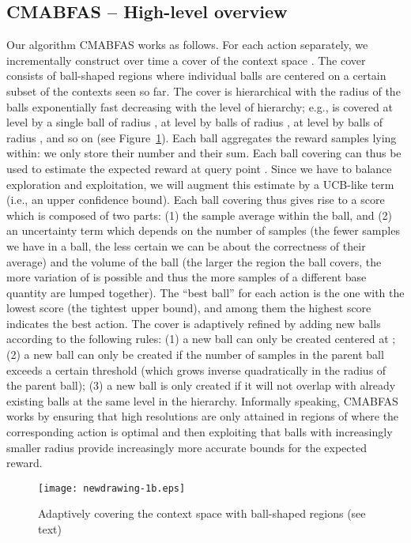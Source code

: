 \documentclass{llncs}
\begin{document}
\subsection{CMABFAS -- High-level overview} 
Our algorithm CMABFAS works as follows. For each action  separately, we incrementally
construct over time  a cover of the context space . The cover 
consists of ball-shaped regions where individual balls are centered on a certain subset
of the contexts  seen so far. The cover is hierarchical with the radius
of the balls exponentially fast decreasing with the level of hierarchy; e.g.,  is covered 
at level  by a single ball of radius , at level  by balls of radius , at 
level  by balls of radius , and so on (see Figure~\ref{fig:12}). Each ball aggregates the reward samples
lying within: we only store their number and their sum. Each ball covering  can thus
be used to estimate the expected reward  at query point . Since we have to 
balance exploration and exploitation, we will augment this estimate by a UCB-like term (i.e., 
an upper confidence bound). Each ball
covering  thus gives rise to a score which is composed of two parts: (1) the sample 
average within the ball, and (2) an uncertainty term which depends on the number
of samples (the fewer samples we have in a ball, the less certain we can be
about the correctness of their average) and the volume of the ball (the larger 
the region the ball covers, the more variation of  is possible and thus the 
more samples of a different base quantity are lumped together). The ``best ball'' 
for each action is the one with the lowest score (the tightest upper bound), and 
among them the highest score indicates the best action.  
The cover is adaptively refined by adding new balls according to the following rules: 
(1) a new ball can only be created centered at ; (2) a new ball can 
only be created if the number of samples in the parent ball exceeds a certain
threshold (which grows inverse quadratically in the radius of the parent ball);
(3) a new ball is only created if it will not overlap with already existing balls
at the same level in the hierarchy. Informally speaking, CMABFAS works by ensuring
that high resolutions are only attained in regions of  where the 
corresponding action is optimal and then exploiting that balls with increasingly smaller
radius provide increasingly more accurate bounds for the expected reward.


\begin{figure}[!t]
\begin{center}
\texttt{[image: newdrawing-1b.eps]}
\end{center}
\caption{Adaptively covering the context space with ball-shaped regions (see text)}
\label{fig:12}
\end{figure}
\end{document}
